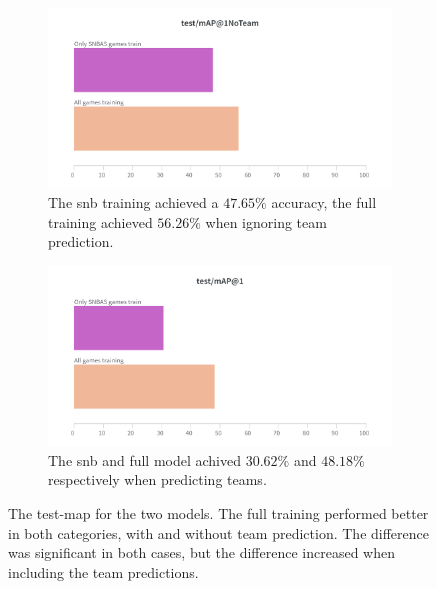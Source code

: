 \begin{figure}
  \begin{subfigure}{0.5\textwidth}
    \includegraphics[width=\linewidth]{figures/total_map_no_team.png}
    \caption{The \acrshort{snb} training achieved a $47.65\%$ accuracy, the full training achieved $56.26\%$ when ignoring team prediction. }
    \label{fig:tdeed_map_no_team}
  \end{subfigure}%
  \hspace*{\fill}   %
  \begin{subfigure}{0.5\textwidth}
    \centering
    \includegraphics[width=\linewidth]{figures/total_map.png}
    \caption{The \acrshort{snb} and full model achived $30.62\%$ and $48.18\%$ respectively when  predicting teams. }
    \label{fig:map_team}
  \end{subfigure}%
  \hspace*{\fill}  
  \caption{The test-\acrshort{map} for the two models. The full training performed better in both categories, with and without team prediction. The difference was significant in both cases, but the difference increased when including the team predictions.}
  \label{fig:tdeed_map}
\end{figure}

